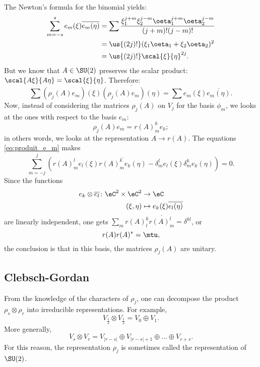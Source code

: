 The Newton's formula for the binomial yields:
\begin{equation}
	\begin{split}
		\sum_{m=-s}^s e_m(\xi)\overline{e_m(\eta)}
		&=\sum\frac{ \xi_1^{j+m}\xi_2^{j-m}\oeta_1^{j+m}\oeta_2^{j-m} }{(j+m)!(j-m)!}\\
		&=\us{(2j)!}(\xi_1\oeta_1+\xi_2\oeta_2)^2\\
		&=\us{(2j)!}\scal{\xi}{\eta}^{2j}.
	\end{split}
\end{equation}
But we know that $A\in\SU(2)$ preserves the scalar product: $\scal{A\xi}{A\eta}=\scal{\xi}{\eta}$. Therefore:
\begin{equation}\label{eq:produit_e_m}
	\sum (\rho_j(A)e_m)(\xi)\overline{ (\rho_j(A)e_m)(\eta) }=\sum e_m(\xi)\overline{e_m(\eta)}.
\end{equation}
Now, instead of considering the matrices $\rho_j(A)$ on $V_j$ for the basis $\phi_m$, we looks at the ones with respect to the basis $e_m$:
\begin{equation}
	\rho_j(A)e_m=r(A)^k_me_k;
\end{equation}
in others words, we looks at the representation $A\to r(A)$. The equations \eqref{eq:produit_e_m} makes
\[
	\sum_{m=-j}^j\left(
	r(A)^l_me_l(\xi)\overline{ r(A)^k_me_k(\eta)   }
	-\delta^l_me_l(\xi)\delta^k_me_k(\eta)
	\right)=0.
\]
Since the functions
\begin{equation}
	\begin{aligned}
		e_k\otimes\overline{e_l}\colon \eC^2\times\eC^2 & \to \eC                               \\
		(\xi,\eta)                                      & \mapsto  e_k(\xi)\overline{e_l(\eta)}
	\end{aligned}
\end{equation}
are linearly independent, one gets $\sum_m r(A)^k_l\overline{r(A)^l_m}=\delta^{kl}$, or
\begin{equation}
	r(A)r(A)^*=\mtu,
\end{equation}
the conclusion is that in this basis, the matrices $\rho_j(A)$ are unitary.

\subsection{Clebsch-Gordan}

From the knowledge of the characters of $\rho_j$, one can decompose the product $\rho_s\otimes\rho_r$ into irreducible representations. For example,
\[
	V_{\frac{1}{2}}\otimes V_{\frac{1}{2}}=V_0\oplus V_1.
\]
More generally,
\begin{equation}
	V_s\otimes V_r=V_{|r-s|} \oplus V_{|r-s|+1}\oplus\ldots\oplus V_{r+s}.
\end{equation}
For this reason, the representation $\rho_j$ is sometimes called the  representation of $\SU(2)$.

